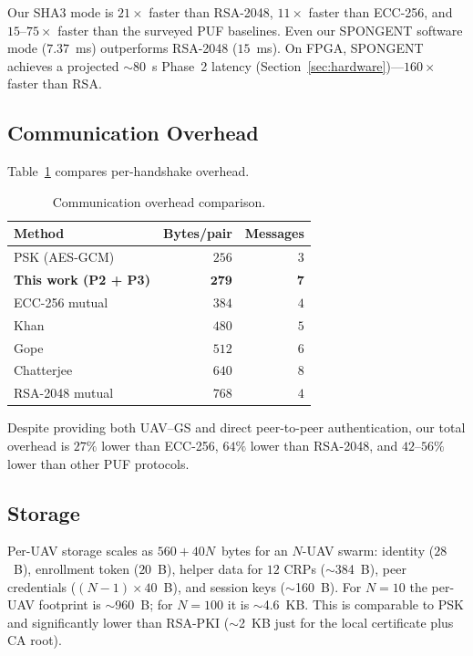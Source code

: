 \documentclass[journal,a4paper,10pt]{IEEEtran}
\begin{document}
Our SHA3 mode is $21\times$ faster than RSA-2048, $11\times$ faster
than ECC-256, and $15$--$75\times$ faster than the surveyed PUF
baselines. Even our SPONGENT software mode ($7.37$~ms) outperforms
RSA-2048 ($15$~ms). On FPGA, SPONGENT achieves a projected
$\sim$80~\textmu s Phase~2 latency
(Section~\ref{sec:hardware})---$160\times$ faster than RSA.

\subsection{Communication Overhead}
Table~\ref{tab:overhead_comparison} compares per-handshake overhead.

\begin{table}[t]
\centering
\caption{Communication overhead comparison.}
\label{tab:overhead_comparison}
\begin{tabular}{@{}lrr@{}}
\toprule
\textbf{Method} & \textbf{Bytes/pair} & \textbf{Messages} \\
\midrule
PSK (AES-GCM)                                   & $256$          & $3$ \\
\textbf{This work (P2 + P3)}                    & $\mathbf{279}$ & $\mathbf{7}$ \\
ECC-256 mutual                                  & $384$          & $4$ \\
Khan \cite{puf_6g_uav}                          & $480$          & $5$ \\
Gope \cite{puf_lightweight_uav}                 & $512$          & $6$ \\
Chatterjee \cite{puf_uav_cross_domain}          & $640$          & $8$ \\
RSA-2048 mutual                                 & $768$          & $4$ \\
\bottomrule
\end{tabular}
\end{table}

Despite providing both UAV--GS and direct peer-to-peer authentication,
our total overhead is $27\%$ lower than ECC-256, $64\%$ lower than
RSA-2048, and $42$--$56\%$ lower than other PUF protocols.

\subsection{Storage}
Per-UAV storage scales as $560 + 40N$~bytes for an $N$-UAV swarm:
identity ($28$~B), enrollment token ($20$~B), helper data for $12$
CRPs ($\sim$384~B), peer credentials ($(N{-}1) \times 40$~B), and
session keys ($\sim$160~B). For $N{=}10$ the per-UAV footprint is
$\sim$960~B; for $N{=}100$ it is $\sim$4.6~KB. This is comparable to
PSK and significantly lower than RSA-PKI ($\sim$2~KB just for the
local certificate plus CA root).
\end{document}
